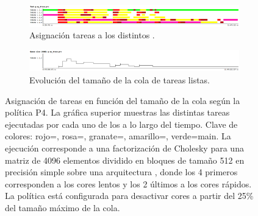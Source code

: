 \begin{figure}
  \centering
  \begin{framed}
    \begin{subfigure}{1\textwidth}
      \centering
      \includegraphics[width=1\linewidth]{Figures/Politicas_evo/Apagado_tareas.png}
      \caption{Asignación tareas a los distintos \wts.}
      \label{}
    \end{subfigure}

\vspace{0.5cm}

    \begin{subfigure}{1\textwidth}
      \centering
      \includegraphics[width=1\linewidth]{Figures/Politicas_evo/Apagado_colas.png}
      \caption{Evolución del tamaño de la cola de tareas listas.}
      \label{}
    \end{subfigure}  
    
  \end{framed}
  \caption[Asignación de tareas en función del tamaño de la cola según la
  política P4]{Asignación de tareas en función del tamaño de la cola según
    la política P4. La gráfica superior muestras las distintas tareas
    ejecutadas por cada uno de los \wts a lo largo del tiempo. Clave de
    colores: rojo=\trsm, rosa=\potrf, granate=\syrk, amarillo=\gemm,
    verde={\sc main}. La ejecución corresponde a una factorización de
    Cholesky para una matriz de 4096 elementos dividido en bloques de
    tamaño 512 en precisión simple sobre una arquitectura \juno, donde los
    4 primeros \wts corresponden a los cores lentos y los 2 últimos a los
    cores rápidos. La política está configurada para desactivar cores a
    partir del 25\% del tamaño máximo de la cola.}
  \label{fig:P4-evo}
\end{figure}




